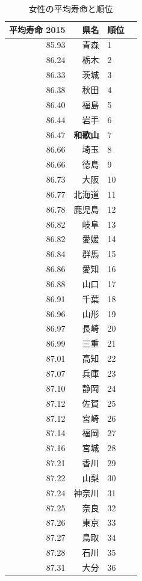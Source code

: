 \begin{table}[ht]
\caption{女性の平均寿命と順位}
\centering
\footnotesize
\begin{tabular}{rrlr}
  \hline
  平均寿命 2015 & 県名 & 順位 \\
  \hline
85.93 & 青森 &   1 \\
 86.24 & 栃木 &   2 \\
 86.33 & 茨城 &   3 \\
 86.38 & 秋田 &   4 \\
 86.40 & 福島 &   5 \\
 86.44 & 岩手 &   6 \\
 86.47 & \textbf{和歌山} &   7 \\
 86.66 & 埼玉 &   8 \\
 86.66 & 徳島 &   9 \\
 86.73 & 大阪 &  10 \\
 86.77 & 北海道 &  11 \\
 86.78 & 鹿児島 &  12 \\
 86.82 & 岐阜 &  13 \\
 86.82 & 愛媛 &  14 \\
 86.84 & 群馬 &  15 \\
 86.86 & 愛知 &  16 \\
 86.88 & 山口 &  17 \\
 86.91 & 千葉 &  18 \\
 86.96 & 山形 &  19 \\
 86.97 & 長崎 &  20 \\
 86.99 & 三重 &  21 \\
 87.01 & 高知 &  22 \\
 87.07 & 兵庫 &  23 \\
 87.10 & 静岡 &  24 \\
 87.12 & 佐賀 &  25 \\
 87.12 & 宮崎 &  26 \\
 87.14 & 福岡 &  27 \\
 87.16 & 宮城 &  28 \\
 87.21 & 香川 &  29 \\
 87.22 & 山梨 &  30 \\
 87.24 & 神奈川 &  31 \\
 87.25 & 奈良 &  32 \\
 87.26 & 東京 &  33 \\
 87.27 & 鳥取 &  34 \\
 87.28 & 石川 &  35 \\
 87.31 & 大分 &  36 \\

\end{tabular}
\end{table}
